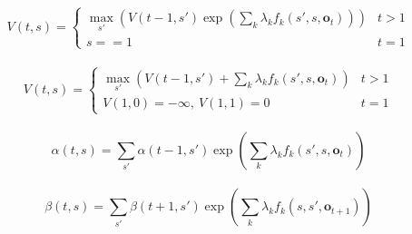 \documentclass[11pt]{article}
\begin{document}
\begin{equation}
V(t, s) = \left\{ \begin{array}{lc}
\max_{s'}( V(t-1, s') \exp \left( \sum_k \lambda_k f_k(s', s, \mathbf{o}_t) \right) ) & t>1 \\
s==1 & t=1
\end{array} \right.
\end{equation}
\\

\begin{equation}
V(t, s) = \left\{ \begin{array}{lc}
\max_{s'}( V(t-1, s') + \sum_k \lambda_k f_k(s', s, \mathbf{o}_t) ) & t>1 \\
V(1,0) = -\infty,\ V(1, 1) = 0 & t=1
\end{array} \right.
\end{equation}
\\

\begin{equation}
    \alpha(t, s) = \sum_{s'} \alpha(t-1, s') \exp \left( \sum_k \lambda_k f_k(s', s, \mathbf{o}_t) \right)
\end{equation}
\\

\begin{equation}
    \beta(t, s) = \sum_{s'} \beta(t+1, s') \exp \left( \sum_k \lambda_k f_k(s, s', \mathbf{o}_{t+1}) \right)
\end{equation}
\\
\end{document}
